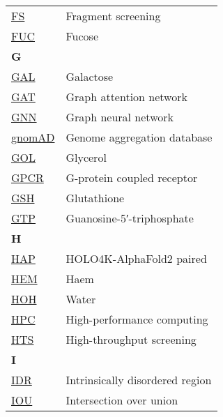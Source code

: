 \begin{longtable}[l]{@{}p{2.5cm}p{12cm}@{}}
\textmd{\href{https://en.wikipedia.org/wiki/Fragment-based_lead_discovery}{FS}} & Fragment screening \\
\textmd{\href{https://www.ebi.ac.uk/pdbe-srv/pdbechem/chemicalCompound/show/FUC}{FUC}} & Fucose \\[0.3175cm]
\textbf{\large G} & \\[0.25cm]
\textmd{\href{https://www.ebi.ac.uk/pdbe-srv/pdbechem/chemicalCompound/show/GAL}{GAL}} & Galactose \\
\textmd{\href{https://en.wikipedia.org/wiki/Graph_neural_network\#Graph_attention_network}{GAT}} & Graph attention network \\
\textmd{\href{https://en.wikipedia.org/wiki/Graph_neural_network}{GNN}} & Graph neural network \\
\textmd{\href{https://gnomad.broadinstitute.org/}{gnomAD}} & Genome aggregation database \\
\textmd{\href{https://www.ebi.ac.uk/pdbe-srv/pdbechem/chemicalCompound/show/GOL}{GOL}} & Glycerol \\
\textmd{\href{https://en.wikipedia.org/wiki/G_protein-coupled_receptor}{GPCR}} & G-protein coupled receptor \\
\textmd{\href{https://www.ebi.ac.uk/pdbe-srv/pdbechem/chemicalCompound/show/GSH}{GSH}} & Glutathione \\
\textmd{\href{https://www.ebi.ac.uk/pdbe-srv/pdbechem/chemicalCompound/show/GTP}{GTP}} & Guanosine-5′-triphosphate \\[0.3175cm]
\textbf{\large H} & \\[0.25cm]
\textmd{\href{https://jcheminf.biomedcentral.com/articles/10.1186/s13321-024-00821-4}{HAP}} & HOLO4K-AlphaFold2 paired \\
\textmd{\href{https://www.ebi.ac.uk/pdbe-srv/pdbechem/chemicalCompound/show/HEM}{HEM}} & Haem \\
\textmd{\href{https://www.ebi.ac.uk/pdbe-srv/pdbechem/chemicalCompound/show/HOH}{HOH}} & Water \\
\textmd{\href{https://en.wikipedia.org/wiki/High-performance_computing}{HPC}} & High-performance computing \\
\textmd{\href{https://en.wikipedia.org/wiki/High-throughput_screening}{HTS}} & High-throughput screening \\[0.3175cm]
\textbf{\large I} & \\[0.25cm]
\textmd{\href{https://en.wikipedia.org/wiki/Intrinsically_disordered_proteins}{IDR}} & Intrinsically disordered region \\
\textmd{\href{https://en.wikipedia.org/wiki/Jaccard_index}{IOU}} & Intersection over union \\

\end{longtable}
